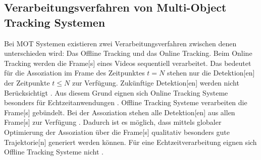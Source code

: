 \subsection{Verarbeitungsverfahren von Multi-Object Tracking Systemen} \label{sec:MOT Verarbeitungsverfahren}
Bei \gls{MOT} Systemen existieren zwei Verarbeitungsverfahren zwischen denen unterschieden wird: Das \gls{Offline Tracking} und das \gls{Online Tracking}. Beim \gls{Online Tracking} werden die \gls{Frame}[s] eines Videos sequentiell verarbeitet. Das bedeutet für die \gls{Assoziation} im \gls{Frame} des Zeitpunktes \(t=N\) stehen nur die \gls{Detektion}[en] der Zeitpunkte \(t \leq N\)  zur Verfügung. Zukünftige \gls{Detektion}[en] werden nicht Berücksichtigt \cite{Luo.2022}. Aus diesem Grund eignen sich \gls{Online Tracking} Systeme besonders für Echtzeitanwendungen \cite{Bewley.2016}. \gls{Offline Tracking} Systeme verarbeiten die \gls{Frame}[s] gebündelt. Bei der \gls{Assoziation} stehen alle \gls{Detektion}[en] aus allen \gls{Frame}[s] zur Verfügung \cite{Luo.2022}. Dadurch ist es möglich, dass mittels globaler Optimierung der \gls{Assoziation} über die \gls{Frame}[s] qualitativ besonders gute \gls{Trajektorie}[n] generiert werden können. Für eine Echtzeitverarbeitung eignen sich \gls{Offline Tracking} Systeme nicht \cite{Luo.2022}. \par